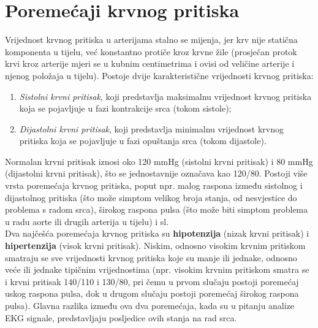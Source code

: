 \documentclass[12pt,a4paper]{article}
\begin{document}
\newpage

\section{Poremećaji krvnog pritiska}

\quad Vrijednost krvnog pritiska u arterijama stalno se mijenja, jer krv nije statična komponenta u tijelu, već konstantno protiče kroz krvne žile (prosječan protok krvi kroz arterije mjeri se u kubnim centimetrima i ovisi od veličine arterije i njenog položaja u tijelu). \cite{blood-pressure}
Postoje dvije karakteristične vrijednosti krvnog pritiska:

\begin{enumerate}

\item \textit{Sistolni krvni pritisak}, koji predstavlja maksimalnu vrijednost krvnog pritiska koja se pojavljuje u fazi kontrakcije srca (tokom sistole);

\item \textit{Dijastolni krvni pritisak}, koji predstavlja minimalnu vrijednost krvnog pritiska koja se pojavljuje u fazi opuštanja srca (tokom dijastole).

\end{enumerate}

Normalan krvni pritisak iznosi oko 120 mmHg (sistolni krvni pritisak) i 80 mmHg (dijastolni krvni pritisak), što se jednostavnije označava kao 120/80. Postoji više vrsta poremećaja krvnog pritiska, poput npr. malog raspona između sistolnog i dijastolnog pritiska (što može simptom velikog broja stanja, od nesvjestice do problema s radom srca), širokog raspona pulsa (što može biti simptom problema u radu aorte ili drugih arterija u tijelu) i sl. \cite{wide-pulse-pressure} \\

Dva najčešća poremećaja krvnog pritiska su \textbf{hipotenzija} (nizak krvni pritisak) i \textbf{hipertenzija} (visok krvni pritisak). Niskim, odnosno visokim krvnim pritiskom smatraju se sve vrijednosti krvnog pritiska koje su manje ili jednake, odnosno veće ili jednake tipičnim vrijednostima (npr. visokim krvnim pritiskom smatra se i krvni pritisak 140/110 i 130/80, pri čemu u prvom slučaju postoji poremećaj uskog raspona pulsa, dok u drugom slučaju postoji poremećaj širokog raspona pulsa). Glavna razlika između ova dva poremećaja, kada su u pitanju analize EKG signale, predstavljaju posljedice ovih stanja na rad srca. \\
\end{document}
